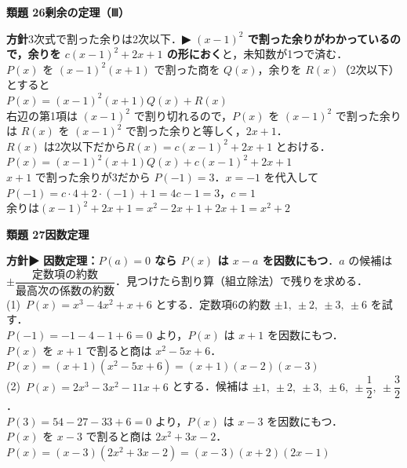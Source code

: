 \documentclass[a4paper,11pt]{ltjsarticle}
\newcommand{\ans}[2]{\Needspace{5\baselineskip}\vspace{6pt}%
  {\sffamily\bfseries 類題 #1\quad #2}\par}
\newcommand{\point}[1]{\textsf{\bfseries ▶ #1}}
\begin{document}
\ans{26}{剰余の定理（Ⅲ）}
\begin{kai}
\textbf{方針}\quad 3次式で割った余りは2次以下．\point{$(x-1)^2$ で割った余りがわかっているので，余りを $c(x-1)^2+2x+1$ の形におく}と，未知数が1つで済む．\\[2pt]
$P(x)$ を $(x-1)^2(x+1)$ で割った商を $Q(x)$，余りを $R(x)$（2次以下）とすると\\
\hspace*{1.5em}$P(x)=(x-1)^2(x+1)Q(x)+R(x)$\\
右辺の第1項は $(x-1)^2$ で割り切れるので，$P(x)$ を $(x-1)^2$ で割った余りは $R(x)$ を $(x-1)^2$ で割った余りと等しく，$2x+1$．\\
$R(x)$ は2次以下だから\quad $R(x)=c(x-1)^2+2x+1$ とおける．\\[2pt]
$P(x)=(x-1)^2(x+1)Q(x)+c(x-1)^2+2x+1$\\
$x+1$ で割った余りが3だから $P(-1)=3$．$x=-1$ を代入して\\
\hspace*{1.5em}$P(-1)=c\cdot4+2\cdot(-1)+1=4c-1=3$，\quad $c=1$\\[2pt]
余りは\quad $(x-1)^2+2x+1=x^2-2x+1+2x+1=x^2+2$
\end{kai}

\ans{27}{因数定理}
\begin{kai}
\textbf{方針}\quad \point{因数定理：$P(a)=0$ なら $P(x)$ は $x-a$ を因数にもつ}．$a$ の候補は $\pm\dfrac{\text{定数項の約数}}{\text{最高次の係数の約数}}$．見つけたら割り算（組立除法）で残りを求める．\\[2pt]
(1)\ $P(x)=x^3-4x^2+x+6$ とする．定数項6の約数 $\pm1,\ \pm2,\ \pm3,\ \pm6$ を試す．\\
\hspace*{1.5em}$P(-1)=-1-4-1+6=0$ より，$P(x)$ は $x+1$ を因数にもつ．\\
\hspace*{1.5em}$P(x)$ を $x+1$ で割ると商は $x^2-5x+6$．\\
\hspace*{1.5em}$P(x)=(x+1)(x^2-5x+6)=(x+1)(x-2)(x-3)$\\[2pt]
(2)\ $P(x)=2x^3-3x^2-11x+6$ とする．候補は $\pm1,\ \pm2,\ \pm3,\ \pm6,\ \pm\dfrac12,\ \pm\dfrac32$．\\
\hspace*{1.5em}$P(3)=54-27-33+6=0$ より，$P(x)$ は $x-3$ を因数にもつ．\\
\hspace*{1.5em}$P(x)$ を $x-3$ で割ると商は $2x^2+3x-2$．\\
\hspace*{1.5em}$P(x)=(x-3)(2x^2+3x-2)=(x-3)(x+2)(2x-1)$
\end{kai}
\end{document}
